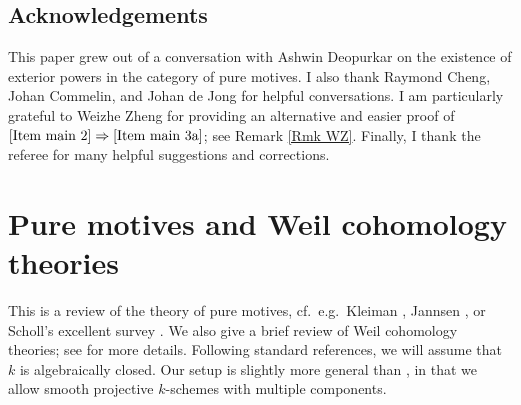 \documentclass[11pt]{amsart}
\theoremstyle{definition}
\newcommand{\Ra}{\Rightarrow}
\begin{document}
\subsection*{Acknowledgements}
{\small This paper grew out of a conversation with Ashwin Deopurkar
on the existence of exterior powers in the category of pure motives.
I also thank Raymond Cheng, Johan Commelin, and Johan de Jong for
helpful conversations. I am particularly grateful to Weizhe Zheng
for providing an alternative and easier proof of $\ref{Item main 2}
\Ra \ref{Item main 3a}$; see Remark \ref{Rmk WZ}. Finally, I thank
the referee for many helpful suggestions and corrections. }






\section{Pure motives and Weil cohomology theories}\label{Sec motives}
This is a review of the theory of pure motives, cf.\ e.g.\ Kleiman \cite{KleAG}, Jannsen \cite{Jan}, or Scholl's excellent survey \cite{Sch}. We also give a brief review of Weil cohomology theories; see \cite[\S 3]{KleMot} for more details. %
%
Following standard references, we will assume that $k$ is
algebraically closed. Our setup is slightly more general than
\cite[\S 3]{KleMot}, in that we allow smooth projective $k$-schemes
with multiple components.
\end{document}
